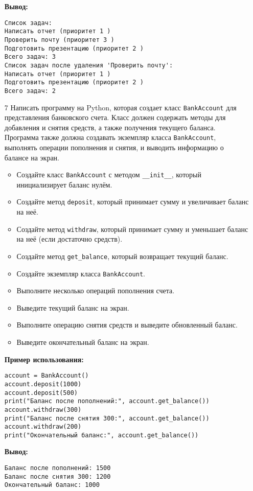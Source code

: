 \begin{enumerate}
\textbf{Вывод:}
\begin{verbatim}
Список задач:
Написать отчет (приоритет 1 )
Проверить почту (приоритет 3 )
Подготовить презентацию (приоритет 2 )
Всего задач: 3
Список задач после удаления 'Проверить почту':
Написать отчет (приоритет 1 )
Подготовить презентацию (приоритет 2 )
Всего задач: 2
\end{verbatim}

\item[7] Написать программу на Python, которая создает класс \texttt{BankAccount} для представления банковского счета. Класс должен содержать методы для добавления и снятия средств, а также получения текущего баланса. Программа также должна создавать экземпляр класса \texttt{BankAccount}, выполнять операции пополнения и снятия, и выводить информацию о балансе на экран.

\begin{itemize}
    \item Создайте класс \texttt{BankAccount} с методом \texttt{\_\_init\_\_}, который инициализирует баланс нулём.
    \item Создайте метод \texttt{deposit}, который принимает сумму и увеличивает баланс на неё.
    \item Создайте метод \texttt{withdraw}, который принимает сумму и уменьшает баланс на неё (если достаточно средств).
    \item Создайте метод \texttt{get\_balance}, который возвращает текущий баланс.
    \item Создайте экземпляр класса \texttt{BankAccount}.
    \item Выполните несколько операций пополнения счета.
    \item Выведите текущий баланс на экран.
    \item Выполните операцию снятия средств и выведите обновленный баланс.
    \item Выведите окончательный баланс на экран.
\end{itemize}

\textbf{Пример использования:}

\begin{verbatim}
account = BankAccount()
account.deposit(1000)
account.deposit(500)
print("Баланс после пополнений:", account.get_balance())
account.withdraw(300)
print("Баланс после снятия 300:", account.get_balance())
account.withdraw(200)
print("Окончательный баланс:", account.get_balance())
\end{verbatim}

\textbf{Вывод:}
\begin{verbatim}
Баланс после пополнений: 1500
Баланс после снятия 300: 1200
Окончательный баланс: 1000
\end{verbatim}


\end{enumerate}

